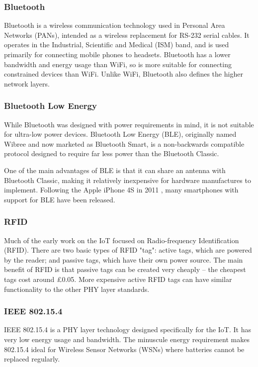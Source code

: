 \documentclass[10pt,journal,compsoc]{IEEEtran}
\begin{document}
\subsubsection{Bluetooth}
Bluetooth is a wireless communication technology used in Personal Area Networks
(PANs), intended as a wireless replacement for RS-232 serial cables. It
operates in the Industrial, Scientific and Medical (ISM) band, and is used
primarily for connecting mobile phones to headsets. Bluetooth has a lower
bandwidth and energy usage than WiFi, so is more suitable for connecting
constrained devices than WiFi. Unlike WiFi, Bluetooth also defines the higher
network layers. 

\subsubsection{Bluetooth Low Energy}
While Bluetooth was designed with power requirements in mind, it is not
suitable for ultra-low power devices. Bluetooth Low Energy (BLE), originally
named Wibree and now marketed as Bluetooth Smart, is a non-backwards
compatible protocol designed to require far less power than the Bluetooth
Classic. 

One of the main advantages of BLE is that it can share an antenna with
Bluetooth Classic, making it relatively inexpensive for hardware manufactures
to implement.  Following the Apple iPhone 4S in 2011 \cite{Engadget2011}, many
smartphones with support for BLE have been released.

\subsubsection{RFID}
Much of the early work on the IoT focused on Radio-frequency Identification
(RFID). There are two basic types of RFID "tag": active tags, which are powered
by the reader; and passive tags, which have their own power source. The main
benefit of RFID is that passive tags can be created very cheaply -- the
cheapest tags cost around \pounds0.05. More expensive active RFID tags can
have similar functionality to the other PHY layer standards. 

\subsubsection{IEEE 802.15.4}
IEEE 802.15.4 is a PHY layer technology designed specifically for the IoT. It
has very low energy usage and bandwidth. The minuscule energy requirement makes
802.15.4 ideal for Wireless Sensor Networks (WSNs) where batteries cannot be
replaced regularly. 
\end{document}
